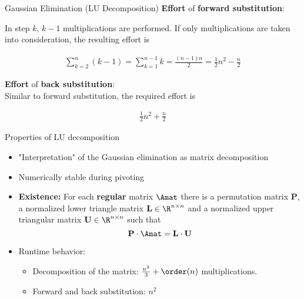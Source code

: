 \documentclass[11pt,compress,t,notes=noshow, xcolor=table]{beamer}
\begin{document}
\begin{vbframe}{Gaussian Elimination (LU Decomposition)}
\textbf{Effort} of \textbf{forward substitution}:\\

\medskip

In step $k$,  $k - 1$ multiplications are performed. If only multiplications are taken into consideration, the resulting effort is

\begin{eqnarray*}
\sum_{k=2}^{n} (k - 1) = \sum_{k=1}^{n - 1} k = \frac{(n- 1)n}{2} = \frac{1}{2}n^2 - \frac{n}{2}
\end{eqnarray*}

\lz

\textbf{Effort} of \textbf{back substitution}:\\
\medskip
Similar to forward substitution, the required effort is

\begin{eqnarray*}
\frac{1}{2}n^2 + \frac{n}{2}
\end{eqnarray*}

\framebreak


\end{vbframe}

\begin{vbframe} {Properties of LU decomposition}

\begin{itemize}
\item "Interpretation" of the Gaussian elimination as matrix decomposition
\item Numerically stable during pivoting
\item \textbf{Existence:} For each \textbf{regular} matrix $\Amat$ there is a permutation matrix $\mathbf{P}$, a normalized lower triangle matrix $\mathbf{L} \in \R^{n \times n}$ and a normalized upper triangular matrix $\mathbf{U} \in \R^{n \times n}$ such that 
$$
\mathbf{P} \cdot \Amat = \mathbf{L} \cdot \mathbf{U}
$$
\item Runtime behavior:
\begin{itemize}
\item Decomposition of the matrix: $\frac{n^3}{3} + \order(n)$ multiplications. 
\item Forward and back substitution: $n^2$
\end{itemize}
\end{itemize}





\end{vbframe}


\endlecture
\end{document}
